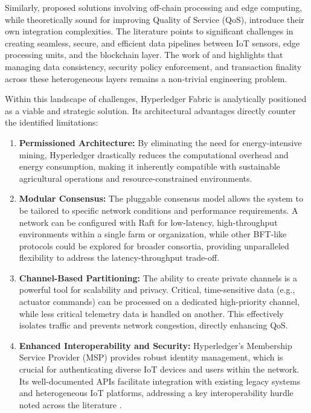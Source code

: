 \documentclass[12pt,onecolumn]{IEEEtran} %
\begin{document}
Similarly, proposed solutions involving off-chain processing and edge computing, while theoretically sound for improving Quality of Service (QoS), introduce their own integration complexities. The literature points to significant challenges in creating seamless, secure, and efficient data pipelines between IoT sensors, edge processing units, and the blockchain layer. The work of \cite{khan2022ablockchainand} and \cite{sizan2505asecuredtriad} highlights that managing data consistency, security policy enforcement, and transaction finality across these heterogeneous layers remains a non-trivial engineering problem.

Within this landscape of challenges, Hyperledger Fabric is analytically positioned as a viable and strategic solution. Its architectural advantages directly counter the identified limitations:
\begin{enumerate}
    \item \textbf{Permissioned Architecture:} By eliminating the need for energy-intensive mining, Hyperledger drastically reduces the computational overhead and energy consumption, making it inherently compatible with sustainable agricultural operations and resource-constrained environments.
    \item \textbf{Modular Consensus:} The pluggable consensus model allows the system to be tailored to specific network conditions and performance requirements. A network can be configured with Raft for low-latency, high-throughput environments within a single farm or organization, while other BFT-like protocols could be explored for broader consortia, providing unparalleled flexibility to address the latency-throughput trade-off.
    \item \textbf{Channel-Based Partitioning:} The ability to create private channels is a powerful tool for scalability and privacy. Critical, time-sensitive data (e.g., actuator commands) can be processed on a dedicated high-priority channel, while less critical telemetry data is handled on another. This effectively isolates traffic and prevents network congestion, directly enhancing QoS.
    \item \textbf{Enhanced Interoperability and Security:} Hyperledger's Membership Service Provider (MSP) provides robust identity management, which is crucial for authenticating diverse IoT devices and users within the network. Its well-documented APIs facilitate integration with existing legacy systems and heterogeneous IoT platforms, addressing a key interoperability hurdle noted across the literature \cite{aliyu2023blockchainbasedsmartfarm, tang2024assessingblockchainand}.
\end{enumerate}
\end{document}
